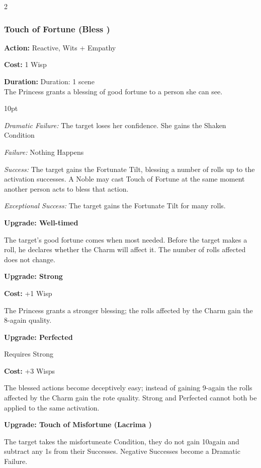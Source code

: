 \begin{multicols}{2}
\subsubsection*{Touch of Fortune (Bless \textbullet\textbullet)}

\noindent \textbf{Action:} Reactive, Wits + Empathy

\noindent \textbf{Cost:} 1 Wisp

\noindent \textbf{Duration:} Duration: 1 scene \\

\noindent The Princess grants a blessing of good fortune to a person she can see.

\begin{myindentpar}{10pt}

\emph{Dramatic Failure:} The target loses her confidence. She gains the Shaken Condition

\emph{Failure:} Nothing Happens 

\emph{Success:}  The target gains the Fortunate Tilt, blessing a number of rolls up to the activation successes. A Noble may cast Touch of Fortune at the same moment another person acts to bless that action.

\emph{Exceptional Success:} The target gains the Fortunate Tilt for many rolls.

\textbf{Upgrade: Well-timed}

The target's good fortune comes when most needed. Before the target makes a roll, he declares whether the Charm will affect it. The number of rolls affected does not change. 

\textbf{Upgrade: Strong}

\noindent \textbf{Cost:} +1 Wisp

The Princess grants a stronger blessing; the rolls affected by the Charm gain the 8-again quality.

\textbf{Upgrade: Perfected}

Requires Strong

\noindent \textbf{Cost:} +3 Wisps

The blessed actions become deceptively easy; instead of gaining 9-again the rolls affected by the Charm gain the rote quality. Strong and Perfected cannot both be applied to the same activation.

\textbf{Upgrade: Touch of Misfortune (Lacrima \textbullet\textbullet)}

The target takes the misfortuneate Condition, they do not gain 10again and subtract any 1s from their Successes. Negative Successes become a Dramatic Failure. 


\end{myindentpar}
\end{multicols}
